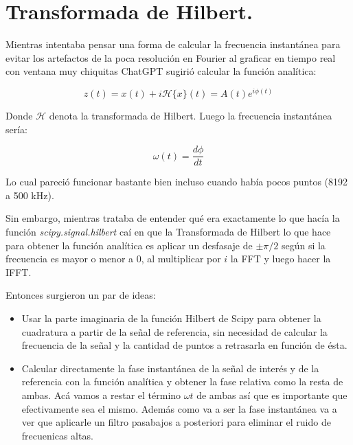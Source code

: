 \section{Transformada de Hilbert.}
Mientras intentaba pensar una forma de calcular la frecuencia instantánea para evitar los artefactos de la poca resolución en Fourier al graficar en tiempo real con ventana muy chiquitas ChatGPT sugirió calcular la función analítica:

\begin{equation}
	z(t)=x(t)+i\mathcal{H}\{x\}(t)=A(t)e^{i\phi(t)}
\end{equation} 

Donde $\mathcal{H}$ denota la transformada de Hilbert. Luego la frecuencia instantánea sería:

\begin{equation}
	\omega(t)=\frac{d\phi}{dt}
\end{equation}

Lo cual pareció funcionar bastante bien incluso cuando había pocos puntos (8192 a 500 kHz). 

Sin embargo, mientras trataba de entender qué era exactamente lo que hacía la función \textit{scipy.signal.hilbert} caí en que la Transformada de Hilbert lo que hace para obtener la función analítica es aplicar un desfasaje de $\pm\pi/2$ según si la frecuencia es mayor o menor a 0, al multiplicar por $i$ la FFT y luego hacer la IFFT. 

Entonces surgieron un par de ideas:
\begin{itemize}
	\item Usar la parte imaginaria de la función Hilbert de Scipy para obtener la cuadratura a partir de la señal de referencia, sin necesidad de calcular la frecuencia de la señal y la cantidad de puntos a retrasarla en función de ésta.
	\item Calcular directamente la fase instantánea de la señal de interés y de la referencia con la función analítica y obtener la fase relativa como la resta de ambas. Acá vamos a restar el término $\omega t$ de ambas así que es importante que efectivamente sea el mismo. Además como va a ser la fase instantánea va a ver que aplicarle un filtro pasabajos a posteriori para eliminar el ruido de frecuenicas altas.
\end{itemize}

